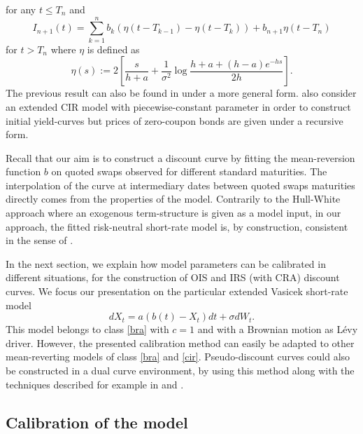 \medskip
for any $t \leq T_n$ and
\begin{equation}
\label{Intb}
I_{n+1}(t) = \sum_{k=1}^n b_k \left( \eta(t - T_{k-1}) -  \eta(t - T_k ) \right) + b_{n+1} \eta(t - T_n)
\end{equation}
for $t > T_n$ where $\eta$ is defined as
\begin{equation}
\eta(s):= 2\left[\frac{s}{h+a} +  \frac{1}{\sigma^2}\log\frac{h+a+(h-a)e^{-hs}}{2h}\right].
\end{equation}
The previous result can also be found in \cite{Bielecki2014} under a more general form. \cite{Schlogl2000} also consider an extended CIR model with piecewise-constant parameter in order to construct initial yield-curves but prices of zero-coupon bonds  are given under a recursive form.%

\medskip

Recall that our aim is to construct a discount curve by fitting the mean-reversion function $b$ on quoted swaps observed for different standard maturities. The interpolation of the curve at intermediary dates between quoted swaps maturities directly comes from the properties of the model.
Contrarily to the Hull-White approach where an exogenous term-structure is given as a model input, in our approach, the fitted risk-neutral short-rate model is, by construction, consistent in the sense of \cite{bjork1999interest}. 

\medskip


In the next section, we explain how model parameters can be calibrated in different situations, for the construction of OIS and IRS (with CRA) discount curves. We focus our presentation on the particular extended Vasicek short-rate model
  \begin{equation}
\label{Vasicek}
dX_t = a(b(t) - X_t)dt + \sigma dW_{t}.
\end{equation}
This model belongs to class \ref{bra} with $c=1$ and with a Brownian motion as L\'evy driver. However, the presented calibration method can easily be adapted to other mean-reverting models of class \ref{bra} and \ref{cir}.
Pseudo-discount curves could also be constructed in a dual curve environment, by using this method along with the techniques described for example in \cite{ametrano2013everything} and \cite{white2012multiple}. 

\subsection{Calibration of the model}

